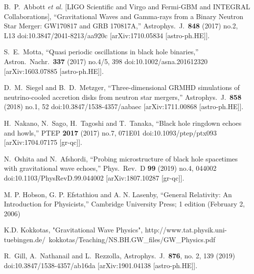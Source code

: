 \documentclass[a4paper,11pt]{article}
\begin{document}
\begin{thebibliography}{99}
  B.~P.~Abbott {\it et al.} [LIGO Scientific and Virgo and Fermi-GBM and INTEGRAL Collaborations],
  ``Gravitational Waves and Gamma-rays from a Binary Neutron Star Merger: GW170817 and GRB 170817A,''
  Astrophys.\ J.\  {\bf 848} (2017) no.2,  L13
  doi:10.3847/2041-8213/aa920c
  [arXiv:1710.05834 [astro-ph.HE]].

  S.~E.~Motta,
  ``Quasi periodic oscillations in black hole binaries,''
  Astron.\ Nachr.\  {\bf 337} (2017) no.4/5,  398
  doi:10.1002/asna.201612320
  [arXiv:1603.07885 [astro-ph.HE]].

  D.~M.~Siegel and B.~D.~Metzger,
  ``Three-dimensional GRMHD simulations of neutrino-cooled accretion disks from neutron star mergers,''
  Astrophys.\ J.\  {\bf 858} (2018) no.1,  52
  doi:10.3847/1538-4357/aabaec
  [arXiv:1711.00868 [astro-ph.HE]].

  H.~Nakano, N.~Sago, H.~Tagoshi and T.~Tanaka,
  ``Black hole ringdown echoes and howls,''
  PTEP {\bf 2017} (2017) no.7,  071E01
  doi:10.1093/ptep/ptx093
  [arXiv:1704.07175 [gr-qc]].
  
  N.~Oshita and N.~Afshordi,
  ``Probing microstructure of black hole spacetimes with gravitational wave echoes,''
  Phys.\ Rev.\ D {\bf 99} (2019) no.4,  044002
  doi:10.1103/PhysRevD.99.044002
  [arXiv:1807.10287 [gr-qc]].

  M. P. Hobson, G. P. Efstathiou and A. N. Lasenby,
  ``General Relativity: An Introduction for Physicists,''
  Cambridge University Press; 1 edition (February 2, 2006)

  K.D. Kokkotas,
  "Gravitational Wave Physics",
  {http://www.tat.physik.uni-tuebingen.de/~kokkotas/Teaching/NS.BH.GW\_files/GW\_Physics.pdf}

  R.~Gill, A.~Nathanail and L.~Rezzolla,
  Astrophys.\ J.\  {\bf 876}, no. 2, 139 (2019)
  doi:10.3847/1538-4357/ab16da
  [arXiv:1901.04138 [astro-ph.HE]].
\end{thebibliography}
\end{document}
